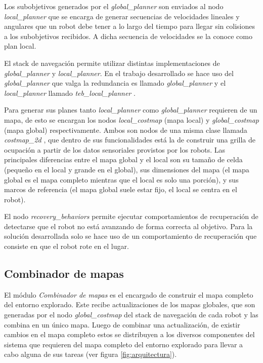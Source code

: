 Los subobjetivos generados por el \emph{global\_planner} son enviados al nodo
\emph{local\_planner} que se encarga de generar secuencias de velocidades
lineales y angulares que un robot debe tener a lo largo del tiempo para llegar
sin colisiones a los subobjetivos recibidos. A dicha secuencia de velocidades
se la conoce como plan local.

El stack de navegación permite utilizar distintas implementaciones de
\emph{global\_planner} y \emph{local\_planner}. En el trabajo desarrollado se
hace uso del \emph{global\_planner} que valga la redundancia es llamado
\emph{global\_planner} \cite{ROS-global_planner}  y el \emph{local\_planner}
llamado \emph{teb\_local\_planner} \cite{ROS-teb_local_planner}.

Para generar sus planes tanto \emph{local\_planner} como \emph{global\_planner}
requieren de un mapa, de esto se encargan los nodos \emph{local\_costmap} (mapa
local) y \emph{global\_costmap} (mapa global) respectivamente. Ambos son
nodos de una misma clase llamada \emph{costmap\_2d}
\cite{ROS-costmap_2d}, que dentro de sus funcionalidades está la de
construir una grilla de ocupación a partir de los datos sensoriales provistos
por los robots. Las principales diferencias entre el mapa global y el local son su
tamaño de celda (pequeño en el local y grande en el global), sus dimensiones
del mapa (el mapa global es el mapa completo mientras que el local es solo una
porción), y sus marcos de referencia (el mapa global suele estar fijo, el local se
centra en el robot).

El nodo \emph{recovery\_behaviors} permite ejecutar comportamientos de
recuperación de detectarse que el robot no está avanzando de forma correcta al
objetivo. Para la solución desarrollada solo se hace uso de un comportamiento
de recuperación que consiste en que el robot rote en el lugar.

\subsection{Combinador de mapas}
El módulo \emph{Combinador de mapas} es el encargado de construir el mapa
completo del entorno explorado. Este recibe actualizaciones de los mapas
globales, que son generadas por el nodo \emph{global\_costmap} del stack de navegación
de cada robot y las combina en un único mapa. Luego de combinar una
actualización, de existir cambios en el mapa completo estos se distribuyen a
los diversos componentes del sistema que requieren del mapa completo del
entorno explorado para llevar a cabo alguna de sus tareas (ver figura
\ref{fig:arquitectura}). 

